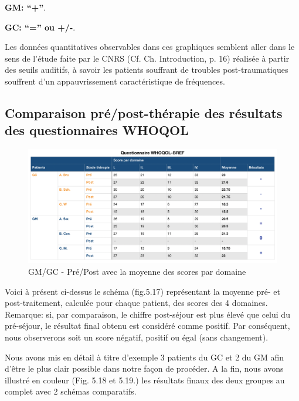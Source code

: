           \textbf{GM: ``+''}.


          \textbf{GC:  ``='' ou +/-}.


        Les données quantitatives observables dans ces graphiques semblent aller dans le
sens de  l'étude faite par le
CNRS (Cf. Ch. Introduction, p. 16) \autocite{affectiveDisorders} réalisée à partir des seuils auditifs, à savoir
les patients souffrant de troubles post-traumatiques souffrent d'un
appauvrissement caractéristique de fréquences.


\subsection{ Comparaison pré/post-thérapie des résultats des
  questionnaires WHOQOL}

\begin{figure}[tbh]
\centering
\includegraphics[width=1.0\linewidth]{images/graphiques/questionnaire_wq.png}
\caption[Questionnaire WHOQOL-BREF]{GM/GC - Pré/Post avec la moyenne des scores par domaine}

\end{figure}
Voici à présent ci-dessus le schéma (fig.5.17) représentant la
moyenne pré- et post-traitement, calculée pour chaque patient, des scores
des 4 domaines.
Remarque: si, par comparaison, le chiffre post-séjour est plus élevé
que celui du
pré-séjour, le résultat final obtenu est considéré comme
positif. Par conséquent, nous
observerons soit un score négatif, positif ou égal (sans changement).


Nous avons mis en détail  à titre d'exemple 3 patients du GC et 2 du GM
afin d'être le plus clair possible
dans notre façon de procéder.
A la fin, nous avons illustré en couleur (Fig. 5.18 et 5.19.) les
résultats finaux des deux groupes au complet avec 2 schémas
comparatifs.

